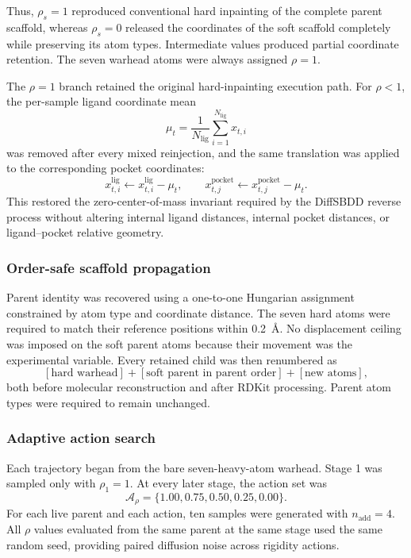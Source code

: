 Thus, \(\rho_s=1\) reproduced conventional hard inpainting of the
complete parent scaffold, whereas \(\rho_s=0\) released the coordinates
of the soft scaffold completely while preserving its atom types.
Intermediate values produced partial coordinate retention. The seven
warhead atoms were always assigned \(\rho=1\).

The \(\rho=1\) branch retained the original hard-inpainting execution
path. For \(\rho<1\), the per-sample ligand coordinate mean
\[
\mu_t =
\frac{1}{N_{\mathrm{lig}}}
\sum_{i=1}^{N_{\mathrm{lig}}}x_{t,i}
\]
was removed after every mixed reinjection, and the same translation was
applied to the corresponding pocket coordinates:
\[
x_{t,i}^{\mathrm{lig}}\leftarrow x_{t,i}^{\mathrm{lig}}-\mu_t,
\qquad
x_{t,j}^{\mathrm{pocket}}\leftarrow x_{t,j}^{\mathrm{pocket}}-\mu_t.
\]
This restored the zero-center-of-mass invariant required by the DiffSBDD
reverse process without altering internal ligand distances, internal
pocket distances, or ligand--pocket relative geometry.

\subsubsection{Order-safe scaffold propagation}

Parent identity was recovered using a one-to-one Hungarian assignment
constrained by atom type and coordinate distance. The seven hard atoms
were required to match their reference positions within 0.2~\AA. No
displacement ceiling was imposed on the soft parent atoms because their
movement was the experimental variable. Every retained child was then
renumbered as
\[
[\text{hard warhead}]
+
[\text{soft parent in parent order}]
+
[\text{new atoms}],
\]
both before molecular reconstruction and after RDKit processing. Parent
atom types were required to remain unchanged.

\subsubsection{Adaptive action search}

Each trajectory began from the bare seven-heavy-atom warhead. Stage 1
was sampled only with \(\rho_1=1\). At every later stage, the action set
was
\[
\mathcal{A}_{\rho}
=
\{1.00,0.75,0.50,0.25,0.00\}.
\]
For each live parent and each action, ten samples were generated with
\(n_{\mathrm{add}}=4\). All \(\rho\) values evaluated from the same parent
at the same stage used the same random seed, providing paired diffusion
noise across rigidity actions.

